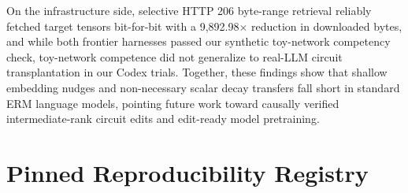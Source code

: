 \documentclass[11pt]{article}
\begin{document}
On the infrastructure side, selective HTTP 206 byte-range retrieval reliably fetched target tensors bit-for-bit with a 9,892.98$\times$ reduction in downloaded bytes, and while both frontier harnesses passed our synthetic toy-network competency check, toy-network competence did not generalize to real-LLM circuit transplantation in our Codex trials. Together, these findings show that shallow embedding nudges and non-necessary scalar decay transfers fall short in standard ERM language models, pointing future work toward causally verified intermediate-rank circuit edits and edit-ready model pretraining.




\appendix

\section{Pinned Reproducibility Registry}
\end{document}
